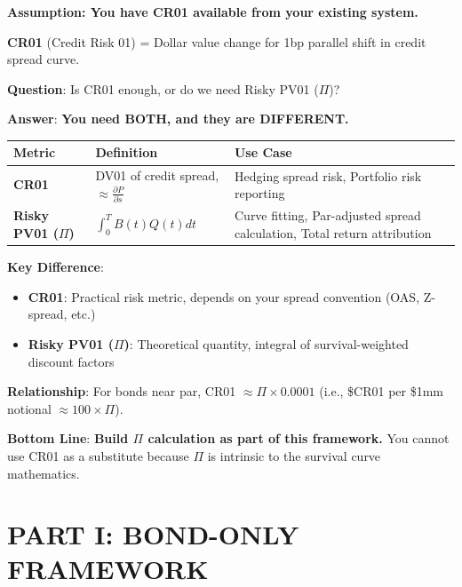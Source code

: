 \documentclass[11pt,a4paper]{article}
\begin{document}
\begin{implbox}
\textbf{Assumption: You have CR01 available from your existing system.}

\textbf{CR01} (Credit Risk 01) = Dollar value change for 1bp parallel shift in credit spread curve.

\textbf{Question}: Is CR01 enough, or do we need Risky PV01 ($\Pi$)?

\textbf{Answer}: \textcolor{warning}{\textbf{You need BOTH, and they are DIFFERENT.}}

\vspace{0.3cm}
\noindent
\begin{tabular}{p{3cm}p{4cm}p{6cm}}
\toprule
\textbf{Metric} & \textbf{Definition} & \textbf{Use Case} \\
\midrule
\textbf{CR01} & DV01 of credit spread, $\approx \frac{\partial P}{\partial s}$ & Hedging spread risk, Portfolio risk reporting \\
\midrule
\textbf{Risky PV01 ($\Pi$)} & $\int_0^T B(t)Q(t)dt$ & Curve fitting, Par-adjusted spread calculation, Total return attribution \\
\bottomrule
\end{tabular}
\vspace{0.3cm}

\textbf{Key Difference}:
\begin{itemize}
    \item \textbf{CR01}: Practical risk metric, depends on your spread convention (OAS, Z-spread, etc.)
    \item \textbf{Risky PV01 ($\Pi$)}: Theoretical quantity, integral of survival-weighted discount factors
\end{itemize}

\textbf{Relationship}: 
For bonds near par, CR01 $\approx \Pi \times 0.0001$ (i.e., \$CR01 per \$1mm notional $\approx 100 \times \Pi$).

\textbf{Bottom Line}: \textcolor{keypoint}{\textbf{Build $\Pi$ calculation as part of this framework.}} You cannot use CR01 as a substitute because $\Pi$ is intrinsic to the survival curve mathematics.
\end{implbox}

\section{PART I: BOND-ONLY FRAMEWORK}
\end{document}
